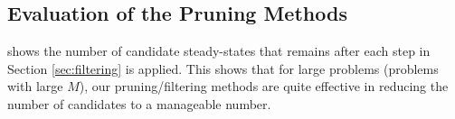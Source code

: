 \subsection{Evaluation of the Pruning Methods}
\label{pruning}

 shows the number of candidate steady-states that remains
after each step in Section \ref{sec:filtering} is applied. This shows
that for large problems (problems with large $M$), our
pruning/filtering methods are quite effective in reducing the number
of candidates to a manageable number.



